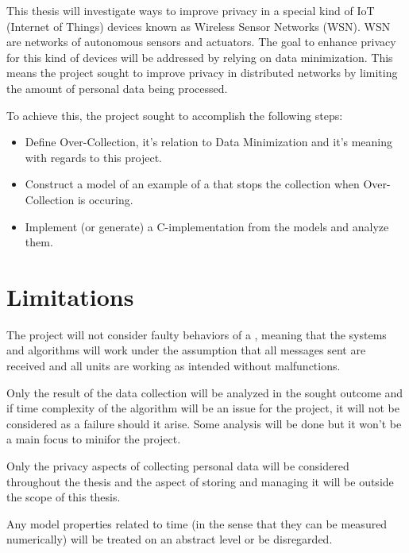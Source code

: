 This thesis will investigate ways to improve privacy in a special kind of IoT (Internet of Things) devices known as Wireless Sensor Networks (WSN). WSN are networks of autonomous sensors and actuators. The goal to enhance privacy for this kind of devices will be addressed by relying on data minimization. This means the project sought to improve privacy in distributed networks by limiting the amount of personal data being processed.

To achieve this, the project sought to accomplish the following steps:

\begin{itemize}
\item Define Over-Collection, it's relation to Data Minimization and it's meaning with regards to this project. 
\item Construct a model of an example of a \wsn that stops the collection when Over-Collection is occuring.
\item Implement (or generate) a C-implementation from the models and analyze them.
\end{itemize} %


\section{Limitations}

The project will not consider faulty behaviors of a \wsn, meaning that the systems and algorithms will work under the assumption that all messages sent are received and all units are working as intended without malfunctions.

Only the result of the data collection will be analyzed in the sought outcome and if time complexity of the algorithm will be an issue for the project, it will not be considered as a failure should it arise. Some analysis will be done but it won't be a main focus to minifor the project.

Only the privacy aspects of collecting personal data will be considered throughout the thesis and the aspect of storing and managing it will be outside the scope of this thesis.

Any model properties related to time (in the sense that they can be measured numerically) will be treated on an abstract level or be disregarded. %

